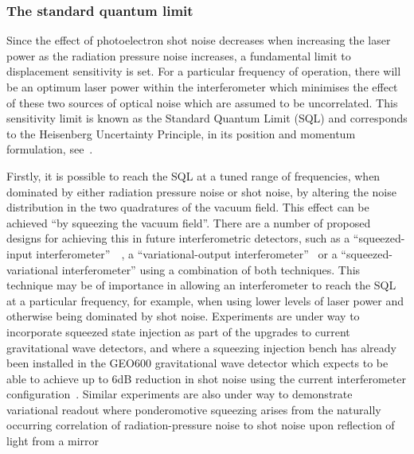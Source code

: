\documentclass{article}
\begin{document}
\subsubsection{The standard quantum limit}
\label{subsubsection:SQL}

Since the effect of photoelectron shot noise decreases when increasing the laser
power as the radiation pressure noise increases, a fundamental limit to
displacement sensitivity is set. For a particular frequency of operation, there
will be an optimum laser power within the interferometer which minimises the
effect of these two sources of optical noise which are assumed to be
uncorrelated. This sensitivity limit is known as the Standard Quantum Limit
(SQL) and corresponds to the Heisenberg Uncertainty Principle, in its position
and momentum formulation, see~\cite{Edelstein, Caves1, Caves2, Loudon:1981}.

Firstly, it is possible to reach the SQL at a tuned range of frequencies, when
dominated by either radiation pressure noise or shot noise, by altering the
noise distribution in the two quadratures of the vacuum field. This effect can
be achieved ``by squeezing the vacuum field''. There are a number of proposed
designs for achieving this in future interferometric detectors, such as a
``squeezed-input interferometer''~\cite{Caves2}~\cite{Unruh:1982}, a
``variational-output interferometer''~\cite{Vyatchanin:1993} or a
``squeezed-variational interferometer'' using a combination of both techniques.
This technique may be of importance in allowing an interferometer to reach the
SQL at a particular frequency, for example, when using lower levels of laser
power and otherwise being dominated by shot noise. Experiments are under way to
incorporate squeezed state injection as part of the upgrades to current
gravitational wave detectors, and where a squeezing injection bench has already
been installed in the GEO600 gravitational wave detector which expects to be
able to achieve up to 6dB reduction in shot noise using the current
interferometer configuration~\cite{Vahlbruch:2010}. Similar experiments are also
under way to demonstrate variational readout where ponderomotive squeezing
arises from the naturally occurring correlation of radiation-pressure noise to
shot noise upon reflection of light from a
mirror~\cite{Corbitt:2006,Sakata:2006}
\end{document}
